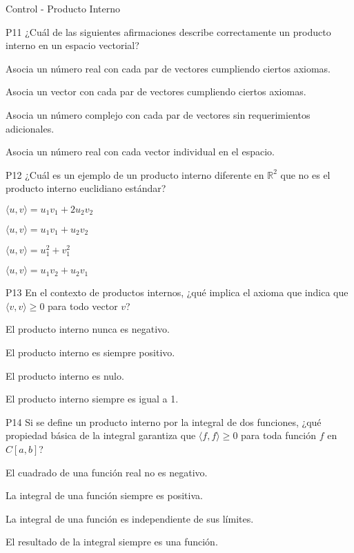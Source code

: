 \documentclass[a4,11pt]{aleph-notas}
\begin{document}
\begin{quiz}{Control - Producto Interno}
\begin{multi}[]%
    {P11}     
    ¿Cuál de las siguientes afirmaciones describe correctamente un producto interno en un espacio vectorial?     
    \item* Asocia un número real con cada par de vectores cumpliendo ciertos axiomas.     
    \item Asocia un vector con cada par de vectores cumpliendo ciertos axiomas.     
    \item Asocia un número complejo con cada par de vectores sin requerimientos adicionales.     
    \item Asocia un número real con cada vector individual en el espacio. 
\end{multi}

\begin{multi}[]%
    {P12}     
    ¿Cuál es un ejemplo de un producto interno diferente en \(\mathbb{R}^2\) que no es el producto interno euclidiano estándar?     
    \item* \(\langle u, v \rangle = u_1v_1 + 2u_2v_2\)     
    \item \(\langle u, v \rangle = u_1v_1 + u_2v_2\)     
    \item \(\langle u, v \rangle = u_1^2 + v_1^2\)     
    \item \(\langle u, v \rangle = u_1v_2 + u_2v_1\) 
\end{multi}

\begin{multi}[]%
    {P13}     
    En el contexto de productos internos, ¿qué implica el axioma que indica que \(\langle v, v \rangle \geq 0\) para todo vector \(v\)?     
    \item* El producto interno nunca es negativo.     
    \item El producto interno es siempre positivo.     
    \item El producto interno es nulo.     
    \item El producto interno siempre es igual a 1. 
\end{multi}

\begin{multi}[]%
    {P14}     
    Si se define un producto interno por la integral de dos funciones, ¿qué propiedad básica de la integral garantiza que \(\langle f, f \rangle \geq 0\) para toda función \(f\) en \(C[a, b]\)?     
    \item* El cuadrado de una función real no es negativo.     
    \item La integral de una función siempre es positiva.     
    \item La integral de una función es independiente de sus límites.     
    \item El resultado de la integral siempre es una función. 
\end{multi}



\end{quiz}
\end{document}

